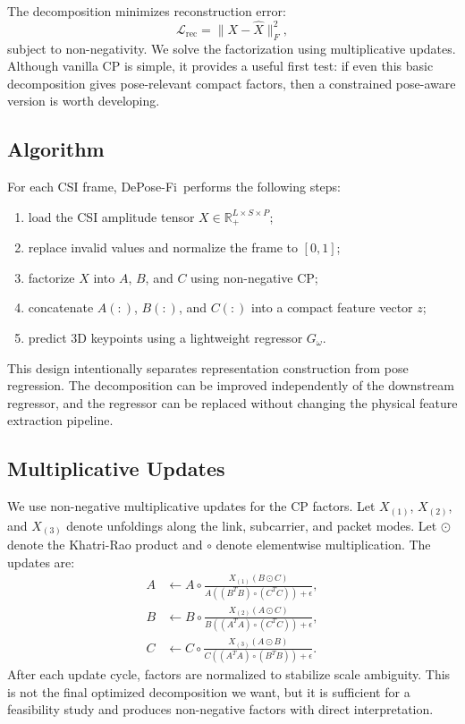 \documentclass[letterpaper]{article}
\newcommand{\method}{DePose-Fi}
\begin{document}
The decomposition minimizes reconstruction error:
\begin{equation}
    \mathcal{L}_{\mathrm{rec}}
    =
    \|X-\hat{X}\|_F^2,
\end{equation}
subject to non-negativity. We solve the factorization using multiplicative updates. Although vanilla CP is simple, it provides a useful first test: if even this basic decomposition gives pose-relevant compact factors, then a constrained pose-aware version is worth developing.

\subsection{Algorithm}

For each CSI frame, \method\ performs the following steps:
\begin{enumerate}
    \item load the CSI amplitude tensor $X\in\mathbb{R}_{+}^{L\times S\times P}$;
    \item replace invalid values and normalize the frame to $[0,1]$;
    \item factorize $X$ into $A$, $B$, and $C$ using non-negative CP;
    \item concatenate $A(:)$, $B(:)$, and $C(:)$ into a compact feature vector $z$;
    \item predict 3D keypoints using a lightweight regressor $G_\omega$.
\end{enumerate}
This design intentionally separates representation construction from pose regression. The decomposition can be improved independently of the downstream regressor, and the regressor can be replaced without changing the physical feature extraction pipeline.

\subsection{Multiplicative Updates}

We use non-negative multiplicative updates for the CP factors. Let $X_{(1)}$, $X_{(2)}$, and $X_{(3)}$ denote unfoldings along the link, subcarrier, and packet modes. Let $\odot$ denote the Khatri-Rao product and $\circ$ denote elementwise multiplication. The updates are:
\begin{align}
    A &\leftarrow A \circ
    \frac{X_{(1)}(B\odot C)}
    {A((B^TB)\circ(C^TC))+\epsilon},\\
    B &\leftarrow B \circ
    \frac{X_{(2)}(A\odot C)}
    {B((A^TA)\circ(C^TC))+\epsilon},\\
    C &\leftarrow C \circ
    \frac{X_{(3)}(A\odot B)}
    {C((A^TA)\circ(B^TB))+\epsilon}.
\end{align}
After each update cycle, factors are normalized to stabilize scale ambiguity. This is not the final optimized decomposition we want, but it is sufficient for a feasibility study and produces non-negative factors with direct interpretation.
\end{document}
